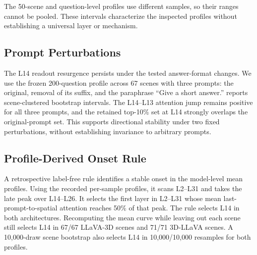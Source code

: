 The 50-scene and question-level profiles use different samples, so their ranges cannot be pooled. These intervals characterize the inspected profiles without establishing a universal layer or mechanism.

\subsection{Prompt Perturbations}
The L14 readout resurgence persists under the tested answer-format changes. We use the frozen 200-question profile across 67 scenes with three prompts: the original, removal of its suffix, and the paraphrase ``Give a short answer.''  reports scene-clustered bootstrap intervals. The L14--L13 attention jump remains positive for all three prompts, and the retained top-10\% set at L14 strongly overlaps the original-prompt set. This supports directional stability under two fixed perturbations, without establishing invariance to arbitrary prompts.

\begin{table}[t]
\centering
\caption{Prompt perturbation of the L14 readout profile.}
\label{tab:supp_prompt}
\end{table}

\subsection{Profile-Derived Onset Rule}
A retrospective label-free rule identifies a stable onset in the model-level mean profiles. Using the recorded per-sample profiles, it scans L2--L31 and takes the late peak over L14--L26. It selects the first layer in L2--L31 whose mean last-prompt-to-spatial attention reaches 50\% of that peak. The rule selects L14 in both architectures. Recomputing the mean curve while leaving out each scene still selects L14 in 67/67 LLaVA-3D scenes and 71/71 3D-LLaVA scenes. A 10,000-draw scene bootstrap also selects L14 in 10,000/10,000 resamples for both profiles.

